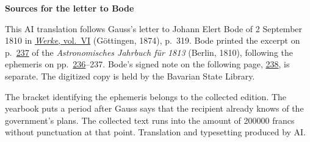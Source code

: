 \clearpage\thispagestyle{empty}
\begin{center}\textbf{Sources for the letter to Bode}\end{center}
\noindent This AI translation follows Gauss’s letter to Johann Elert Bode of 2 September 1810 in \href{https://gdz.sub.uni-goettingen.de/id/PPN236007467}{\textit{Werke}, vol.~VI} (Göttingen, 1874), p.~319. Bode printed the excerpt on p.~\href{https://api.digitale-sammlungen.de/iiif/image/v2/bsb10538342_00245/full/1600,/0/default.jpg}{237} of the \textit{Astronomisches Jahrbuch für 1813} (Berlin, 1810), following the ephemeris on pp.~\href{https://api.digitale-sammlungen.de/iiif/image/v2/bsb10538342_00244/full/1600,/0/default.jpg}{236}--237. Bode’s signed note on the following page, \href{https://api.digitale-sammlungen.de/iiif/image/v2/bsb10538342_00246/full/1600,/0/default.jpg}{238}, is separate. The digitized copy is held by the Bavarian State Library.
\par\smallskip\noindent The bracket identifying the ephemeris belongs to the collected edition. The yearbook puts a period after Gauss says that the recipient already knows of the government’s plans. The collected text runs into the amount of 200000 francs without punctuation at that point. Translation and typesetting produced by AI.
\clearpage
